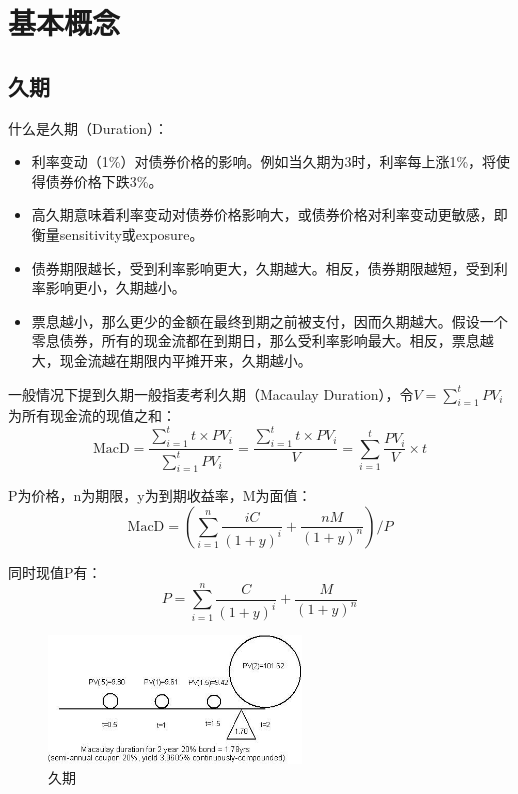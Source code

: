 \documentclass[11pt]{article}
\begin{document}
\maketitle
\tableofcontents

\section{基本概念}

\subsection{久期}

什么是久期（Duration）：
\begin{itemize}
    \item 利率变动（1\%）对债券价格的影响。例如当久期为3时，利率每上涨1\%，将使得债券价格下跌3\%。
    \item 高久期意味着利率变动对债券价格影响大，或债券价格对利率变动更敏感，即衡量sensitivity或exposure。
    \item 债券期限越长，受到利率影响更大，久期越大。相反，债券期限越短，受到利率影响更小，久期越小。
    \item 票息越小，那么更少的金额在最终到期之前被支付，因而久期越大。假设一个零息债券，所有的现金流都在到期日，那么受利率影响最大。相反，票息越大，现金流越在期限内平摊开来，久期越小。
\end{itemize}

一般情况下提到久期一般指麦考利久期（Macaulay Duration），令$V=\sum_{i=1}^{t} PV_i$为所有现金流的现值之和：
\begin{equation*}
    \text{MacD} = \frac{\sum_{i=1}^{t} t \times PV_i}{\sum_{i=1}^{t} PV_i}
    = \frac{\sum_{i=1}^{t}t\times PV_i}{V} = \sum_{i=1}^{t} \frac{PV_i}{V} \times t
\end{equation*}

P为价格，n为期限，y为到期收益率，M为面值：
\begin{equation*}
    \text{MacD} = \left(\sum_{i=1}^{n} \frac{iC}{(1+y)^i} + \frac{nM}{(1+y)^n}\right) \bigg/ P
\end{equation*}

同时现值P有：
\begin{equation*}
    P = \sum_{i=1}^{n} \frac{C}{(1+y)^i} + \frac{M}{(1+y)^n}
\end{equation*}

\begin{figure}[H]
    \centering
    \includegraphics[width=0.6\textwidth]{fig/duration.jpeg}
    \caption{久期}
    \label{fig:duration}
\end{figure}
\end{document}
